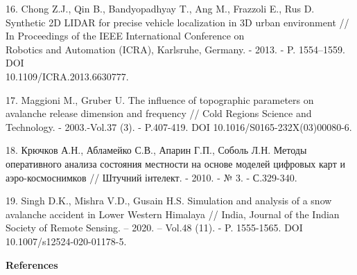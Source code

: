 \begin{references}
16. Chong Z.J., Qin B., Bandyopadhyay T., Ang M., Frazzoli E., Rus D.
Synthetic 2D LIDAR for precise vehicle localization in 3D urban
environment // In Proceedings of the IEEE International Conference on\\
Robotics and Automation (ICRA), Karlsruhe, Germany. - 2013. - P.
1554--1559. DOI \\10.1109/ICRA.2013.6630777.

17. Maggioni M., Gruber U. The influence of topographic parameters on
avalanche release dimension and frequency // Cold Regions Science and
Technology. - 2003.-Vol.37 (3). - P.407-419. DOI
10.1016/S0165-232X(03)00080-6.

18. Крючков А.Н., Абламейко С.В., Апарин Г.П., Соболь Л.Н. Методы
оперативного анализа состояния местности на основе моделей цифровых карт
и аэро-космоснимков // Штучний інтелект. - 2010. - № 3. - С.329-340.

19. Singh D.K., Mishra V.D., Gusain H.S. Simulation and analysis of a
snow avalanche accident in Lower Western Himalaya // India, Journal of
the Indian Society of Remote Sensing. -- 2020. -- Vol.48 (11). - P.
1555-1565. DOI 10.1007/s12524-020-01178-5.
\end{references}

\begin{center}
{\bfseries References}
\end{center}

